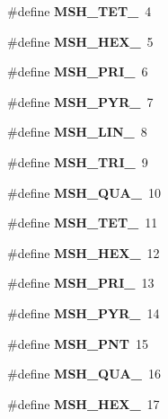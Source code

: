 \begin{DoxyCompactItemize}
\item 
\#define {\bfseries M\-S\-H\-\_\-\-T\-E\-T\-\_}~4\label{GmshDefines_8h_afef7631f9624449225c7210285a1f6ce}

\item 
\#define {\bfseries M\-S\-H\-\_\-\-H\-E\-X\-\_}~5\label{GmshDefines_8h_a43f759764cfaeac1f11ac841ef2bec8a}

\item 
\#define {\bfseries M\-S\-H\-\_\-\-P\-R\-I\-\_}~6\label{GmshDefines_8h_a2f8f6513e57b341c08825cf8cc27b23f}

\item 
\#define {\bfseries M\-S\-H\-\_\-\-P\-Y\-R\-\_}~7\label{GmshDefines_8h_aa4a8889016de9ffb95cc6ce7d03a2e3a}

\item 
\#define {\bfseries M\-S\-H\-\_\-\-L\-I\-N\-\_}~8\label{GmshDefines_8h_a0ec3b29de7403811db9780cb42824eed}

\item 
\#define {\bfseries M\-S\-H\-\_\-\-T\-R\-I\-\_}~9\label{GmshDefines_8h_abe4bf7c65a2541c8cbca81ff403f9356}

\item 
\#define {\bfseries M\-S\-H\-\_\-\-Q\-U\-A\-\_}~10\label{GmshDefines_8h_aa2f6754b675e12643411d7e1b53595ea}

\item 
\#define {\bfseries M\-S\-H\-\_\-\-T\-E\-T\-\_}~11\label{GmshDefines_8h_ae170cc2fd45010ef182a7a936071e798}

\item 
\#define {\bfseries M\-S\-H\-\_\-\-H\-E\-X\-\_}~12\label{GmshDefines_8h_af44d381a31ff582dac837c19325a61b4}

\item 
\#define {\bfseries M\-S\-H\-\_\-\-P\-R\-I\-\_}~13\label{GmshDefines_8h_a6d0bf36347c6e21d05b30fae74ccd55b}

\item 
\#define {\bfseries M\-S\-H\-\_\-\-P\-Y\-R\-\_}~14\label{GmshDefines_8h_a5f4bd094656338ecc201da0ebe45f4f7}

\item 
\#define {\bfseries M\-S\-H\-\_\-\-P\-N\-T}~15\label{GmshDefines_8h_a71d178345aafb608c702e32e8a350f3f}

\item 
\#define {\bfseries M\-S\-H\-\_\-\-Q\-U\-A\-\_}~16\label{GmshDefines_8h_aad6303c631d17d09fd2799c94139092a}

\item 
\#define {\bfseries M\-S\-H\-\_\-\-H\-E\-X\-\_}~17\label{GmshDefines_8h_ad89270090adbacbf8b273a2d5d96559c}


\end{DoxyCompactItemize}

